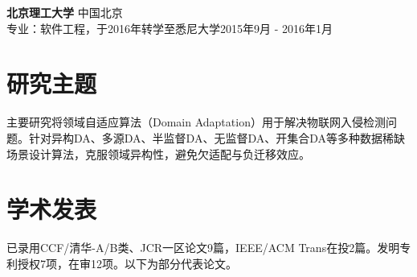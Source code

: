 \documentclass[UTF8,letterpaper,11pt]{article}
\begin{document}
\vspace{9pt}

\textbf{北京理工大学} \hfill 中国北京\\
专业：软件工程，于2016年转学至悉尼大学\hfill 2015年9月 - 2016年1月\\

\vspace{1pt}




\section{\textbf{研究主题}}

主要研究将领域自适应算法（Domain Adaptation）用于解决物联网入侵检测问题。针对异构DA、多源DA、半监督DA、无监督DA、开集合DA等多种数据稀缺场景设计算法，克服领域异构性，避免欠适配与负迁移效应。

\vspace{1pt}




\section{\textbf{学术发表}}

已录用CCF/清华-A/B类、JCR一区论文9篇，IEEE/ACM Trans在投2篇。发明专利授权7项，在审12项。以下为部分代表论文。
\end{document}
